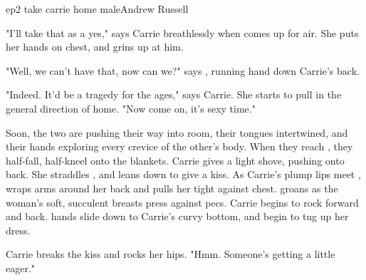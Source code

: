 \documentclass{book}
\begin{document}
\begin{childnode}{ep2 take carrie home male}{Andrew Russell}

    "I'll take that as a yes," says Carrie breathlessly when \name{} comes up for air. She puts her hands on \names{} chest, and grins up at him. 

    {"Well, we can't have that, now can we?" says \name{}, running \hisher{} hand down Carrie's back.} %

    {"Indeed. It'd be a tragedy for the ages," says Carrie. She starts to pull \name{} in the general direction of \hisher{} home. "Now come on, it's sexy time."}



    Soon, the two are pushing their way into \names{} room, their tongues intertwined, and their hands exploring every crevice of the other's body. When they reach \names{}
    , they half-fall, half-kneel onto the blankets. Carrie gives \name{} a light shove, pushing \himher{} onto \hisher{} back. She straddles \himher{}, 
    and leans down to give \himher{} a kiss.
    As Carrie's plump lips meet \hishers{}, \name{} wraps \hisher{} arms around her back and pulls her tight against \hisher{} chest. \HeShe{} groans as the woman's soft, succulent breasts press 
    against
    \hisher{}  pecs. Carrie begins to rock forward and back. \names{} hands slide down to Carrie's curvy bottom, and begin to tug up her dress. 

    Carrie breaks the kiss and rocks her hips. "Hmm. Someone's getting a little eager."


\end{childnode}
\end{document}
